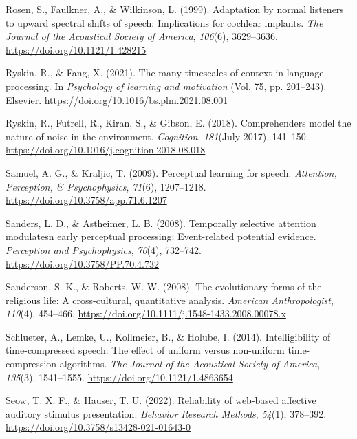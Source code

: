 \documentclass[a4paper, nobind]{templates/ociamthesis}
\newlength{\cslhangindent}
\newenvironment{CSLReferences}[2] %
 {%
  \setlength{\parindent}{0pt}
  \ifodd #1
  \let\oldpar\par
  \def\par{\hangindent=\cslhangindent\oldpar}
  \fi
  \setlength{\parskip}{1mm}
  \setlength{\baselineskip}{6mm}
 }%
 {}
\begin{document}
\begin{CSLReferences}{1}{0}
\leavevmode{}%
Rosen, S., Faulkner, A., \& Wilkinson, L. (1999). Adaptation by normal listeners to upward spectral shifts of speech: Implications for cochlear implants. \emph{The Journal of the Acoustical Society of America}, \emph{106}(6), 3629--3636. \url{https://doi.org/10.1121/1.428215}

\leavevmode{}%
Ryskin, R., \& Fang, X. (2021). The many timescales of context in language processing. In \emph{Psychology of learning and motivation} (Vol. 75, pp. 201--243). Elsevier. \url{https://doi.org/10.1016/bs.plm.2021.08.001}

\leavevmode{}%
Ryskin, R., Futrell, R., Kiran, S., \& Gibson, E. (2018). {Comprehenders model the nature of noise in the environment}. \emph{Cognition}, \emph{181}(July 2017), 141--150. \url{https://doi.org/10.1016/j.cognition.2018.08.018}

\leavevmode{}%
Samuel, A. G., \& Kraljic, T. (2009). Perceptual learning for speech. \emph{Attention, Perception, \& Psychophysics}, \emph{71}(6), 1207--1218. \url{https://doi.org/10.3758/app.71.6.1207}

\leavevmode{}%
Sanders, L. D., \& Astheimer, L. B. (2008). {Temporally selective attention modulatesn early perceptual processing: Event-related potential evidence}. \emph{Perception and Psychophysics}, \emph{70}(4), 732--742. \url{https://doi.org/10.3758/PP.70.4.732}

\leavevmode{}%
Sanderson, S. K., \& Roberts, W. W. (2008). {The evolutionary forms of the religious life: A cross-cultural, quantitative analysis}. \emph{American Anthropologist}, \emph{110}(4), 454--466. \url{https://doi.org/10.1111/j.1548-1433.2008.00078.x}

\leavevmode{}%
Schlueter, A., Lemke, U., Kollmeier, B., \& Holube, I. (2014). {Intelligibility of time-compressed speech: The effect of uniform versus non-uniform time-compression algorithms}. \emph{The Journal of the Acoustical Society of America}, \emph{135}(3), 1541--1555. \url{https://doi.org/10.1121/1.4863654}

\leavevmode{}%
Seow, T. X. F., \& Hauser, T. U. (2022). {Reliability of web-based affective auditory stimulus presentation}. \emph{Behavior Research Methods}, \emph{54}(1), 378--392. \url{https://doi.org/10.3758/s13428-021-01643-0}


\end{CSLReferences}
\end{document}
